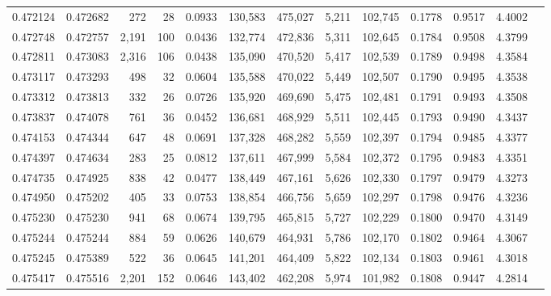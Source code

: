\begin{tabular}{rrrrrrrrrrrrr}
0.472124 & 0.472682 &   272 &    28 &                                     0.0933 & 130,583 & 475,027 &   5,211 & 102,745 & 0.1778 & 0.9517 & 4.4002 \\
0.472748 & 0.472757 & 2,191 &   100 &                                     0.0436 & 132,774 & 472,836 &   5,311 & 102,645 & 0.1784 & 0.9508 & 4.3799 \\
0.472811 & 0.473083 & 2,316 &   106 &                                     0.0438 & 135,090 & 470,520 &   5,417 & 102,539 & 0.1789 & 0.9498 & 4.3584 \\
0.473117 & 0.473293 &   498 &    32 &                                     0.0604 & 135,588 & 470,022 &   5,449 & 102,507 & 0.1790 & 0.9495 & 4.3538 \\
0.473312 & 0.473813 &   332 &    26 &                                     0.0726 & 135,920 & 469,690 &   5,475 & 102,481 & 0.1791 & 0.9493 & 4.3508 \\
0.473837 & 0.474078 &   761 &    36 &                                     0.0452 & 136,681 & 468,929 &   5,511 & 102,445 & 0.1793 & 0.9490 & 4.3437 \\
0.474153 & 0.474344 &   647 &    48 &                                     0.0691 & 137,328 & 468,282 &   5,559 & 102,397 & 0.1794 & 0.9485 & 4.3377 \\
0.474397 & 0.474634 &   283 &    25 &                                     0.0812 & 137,611 & 467,999 &   5,584 & 102,372 & 0.1795 & 0.9483 & 4.3351 \\
0.474735 & 0.474925 &   838 &    42 &                                     0.0477 & 138,449 & 467,161 &   5,626 & 102,330 & 0.1797 & 0.9479 & 4.3273 \\
0.474950 & 0.475202 &   405 &    33 &                                     0.0753 & 138,854 & 466,756 &   5,659 & 102,297 & 0.1798 & 0.9476 & 4.3236 \\
0.475230 & 0.475230 &   941 &    68 &                                     0.0674 & 139,795 & 465,815 &   5,727 & 102,229 & 0.1800 & 0.9470 & 4.3149 \\
0.475244 & 0.475244 &   884 &    59 &                                     0.0626 & 140,679 & 464,931 &   5,786 & 102,170 & 0.1802 & 0.9464 & 4.3067 \\
0.475245 & 0.475389 &   522 &    36 &                                     0.0645 & 141,201 & 464,409 &   5,822 & 102,134 & 0.1803 & 0.9461 & 4.3018 \\
0.475417 & 0.475516 & 2,201 &   152 &                                     0.0646 & 143,402 & 462,208 &   5,974 & 101,982 & 0.1808 & 0.9447 & 4.2814 \\

\end{tabular}

